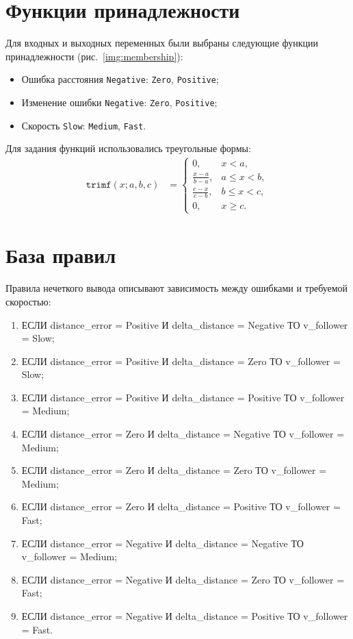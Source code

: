 \section{Функции принадлежности}

Для входных и выходных переменных были выбраны следующие функции принадлежности (рис.~\ref{img:membership}):

\begin{itemize}
    \item Ошибка расстояния \texttt{Negative}: \texttt{Zero}, \texttt{Positive};
    \item Изменение ошибки \texttt{Negative}: \texttt{Zero}, \texttt{Positive};
    \item Скорость \texttt{Slow}: \texttt{Medium}, \texttt{Fast}.
\end{itemize}

Для задания функций использовались треугольные формы:
\begin{align*}
\texttt{trimf}(x; a,b,c) &= 
\begin{cases}
0, & x < a,\\
\frac{x-a}{b-a}, & a \le x < b,\\
\frac{c-x}{c-b}, & b \le x < c,\\
0, & x \ge c.
\end{cases}
\end{align*}


\section{База правил}

Правила нечеткого вывода описывают зависимость между ошибками и требуемой скоростью:

\begin{enumerate}
    \item ЕСЛИ distance\_error = Positive И delta\_distance = Negative ТО v\_follower = Slow;
    \item ЕСЛИ distance\_error = Positive И delta\_distance = Zero ТО v\_follower = Slow;
    \item ЕСЛИ distance\_error = Positive И delta\_distance = Positive ТО v\_follower = Medium;
    \item ЕСЛИ distance\_error = Zero И delta\_distance = Negative ТО v\_follower = Medium;
    \item ЕСЛИ distance\_error = Zero И delta\_distance = Zero ТО v\_follower = Medium;
    \item ЕСЛИ distance\_error = Zero И delta\_distance = Positive ТО v\_follower = Fast;
    \item ЕСЛИ distance\_error = Negative И delta\_distance = Negative ТО v\_follower = Medium;
    \item ЕСЛИ distance\_error = Negative И delta\_distance = Zero ТО v\_follower = Fast;
    \item ЕСЛИ distance\_error = Negative И delta\_distance = Positive ТО v\_follower = Fast.
\end{enumerate}

